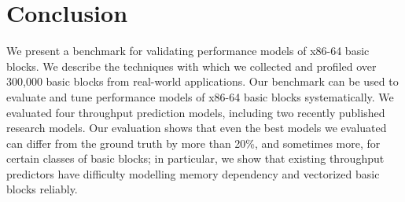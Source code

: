 \section{Conclusion}
We present a benchmark for validating performance models of x86-64 basic blocks.
We describe the techniques with which we collected
and profiled over 300,000 basic blocks from real-world applications.
Our benchmark can be used to evaluate and tune performance models
of x86-64 basic blocks systematically.
We evaluated four throughput prediction models, including two recently
published research models.
Our evaluation shows that even the best models we evaluated can differ from
the ground truth by more than 20\%, and sometimes more, 
for certain classes of basic blocks;
in particular, we show that existing throughput predictors have difficulty 
modelling memory dependency and vectorized basic blocks reliably.